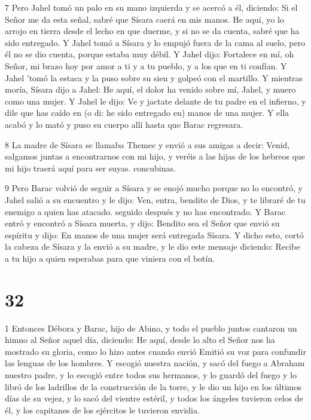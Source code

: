 \par 7 Pero Jahel tomó un palo en su mano izquierda y se acercó a él, diciendo: Si el Señor me da esta señal, sabré que Sísara caerá en mis manos. He aquí, yo lo arrojo en tierra desde el lecho en que duerme, y si no se da cuenta, sabré que ha sido entregado. Y Jahel tomó a Sísara y lo empujó fuera de la cama al suelo, pero él no se dio cuenta, porque estaba muy débil. Y Jahel dijo: Fortalece en mí, oh Señor, mi brazo hoy por amor a ti y a tu pueblo, y a los que en ti confían. Y Jahel 'tomó la estaca y la puso sobre su sien y golpeó con el martillo. Y mientras moría, Sísara dijo a Jahel: He aquí, el dolor ha venido sobre mí, Jahel, y muero como una mujer. Y Jahel le dijo: Ve y jactate delante de tu padre en el infierno, y dile que has caído en (o di: he sido entregado en) manos de una mujer. Y ella acabó y lo mató y puso su cuerpo allí hasta que Barac regresara.

\par 8 La madre de Sísara se llamaba Themec y envió a sus amigas a decir: Venid, salgamos juntas a encontrarnos con mi hijo, y veréis a las hijas de los hebreos que mi hijo traerá aquí para ser suyas. concubinas.

\par 9 Pero Barac volvió de seguir a Sísara y se enojó mucho porque no lo encontró, y Jahel salió a su encuentro y le dijo: Ven, entra, bendito de Dios, y te libraré de tu enemigo a quien has atacado. seguido después y no has encontrado. Y Barac entró y encontró a Sísara muerta, y dijo: Bendito sea el Señor que envió su espíritu y dijo: En manos de una mujer será entregada Sísara. Y dicho esto, cortó la cabeza de Sísara y la envió a su madre, y le dio este mensaje diciendo: Recibe a tu hijo a quien esperabas para que viniera con el botín.



\chapter{32}

\par 1 Entonces Débora y Barac, hijo de Abino, y todo el pueblo juntos cantaron un himno al Señor aquel día, diciendo: He aquí, desde lo alto el Señor nos ha mostrado su gloria, como lo hizo antes cuando envió Emitió su voz para confundir las lenguas de los hombres. Y escogió nuestra nación, y sacó del fuego a Abraham nuestro padre, y lo escogió entre todos sus hermanos, y lo guardó del fuego y lo libró de los ladrillos de la construcción de la torre, y le dio un hijo en los últimos días de su vejez, y lo sacó del vientre estéril, y todos los ángeles tuvieron celos de él, y los capitanes de los ejércitos le tuvieron envidia.

